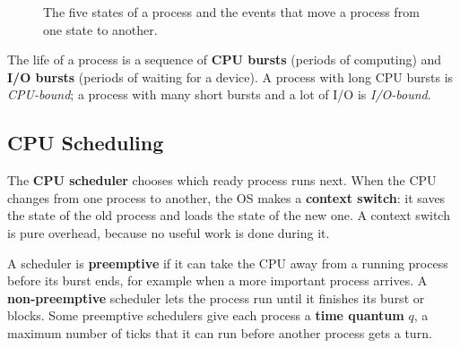 \begin{figure}[H]
    \centering
    \caption{The five states of a process and the events that move a process from one state to another.}
    \label{fig:states}
\end{figure}

The life of a process is a sequence of \textbf{CPU bursts} (periods of computing) and \textbf{I/O bursts} (periods of waiting for a device). A process with long CPU bursts is \emph{CPU-bound}; a process with many short bursts and a lot of I/O is \emph{I/O-bound}.

\subsection{CPU Scheduling}
The \textbf{CPU scheduler} chooses which ready process runs next. When the CPU changes from one process to another, the OS makes a \textbf{context switch}: it saves the state of the old process and loads the state of the new one. A context switch is pure overhead, because no useful work is done during it.

A scheduler is \textbf{preemptive} if it can take the CPU away from a running process before its burst ends, for example when a more important process arrives. A \textbf{non-preemptive} scheduler lets the process run until it finishes its burst or blocks. Some preemptive schedulers give each process a \textbf{time quantum} $q$, a maximum number of ticks that it can run before another process gets a turn.

